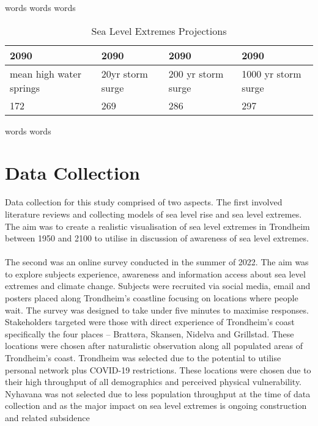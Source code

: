 words words words
\begin{table}[h]
    \centering
    \begin{tabular}{|l|l|l|l|}
    \hline
        2090 & 2090 & 2090 & 2090 \\ \hline
        mean high water springs & 20yr storm surge  & 200 yr storm surge  &  1000 yr storm surge  \\ \hline
        172 & 269 & 286 & 297 \\ \hline
    \end{tabular}
    \caption{Sea Level Extremes Projections}
    \label{2090_sle_projections}
\end{table}
words words
\section{Data Collection}

Data collection for this study comprised of two aspects.  The first involved literature reviews and collecting models of sea level rise and sea level extremes. The aim was to create a realistic visualisation of sea level extremes in Trondheim between 1950 and 2100 to utilise in discussion of awareness of sea level extremes. 
    \paragraph{}
The second was an online survey conducted in the summer of 2022. The aim was to explore subjects experience, awareness and information access about sea level extremes and climate change. Subjects were recruited via social media, email and posters placed along Trondheim’s coastline focusing on locations where people wait. The survey was designed to take under five minutes to maximise responses. Stakeholders targeted were those with direct experience of Trondheim’s coast specifically the four places – Brattøra, Skansen, Nidelva and Grillstad. These locations were chosen after naturalistic observation along all populated areas of Trondheim’s coast. Trondheim was selected due to the potential to utilise personal network plus COVID-19 restrictions. These locations were chosen due to their high throughput of all demographics and perceived physical vulnerability. Nyhavana was not selected due to less population throughput at the time of data collection and as the major impact on sea level extremes is ongoing construction and related subsidence \cite{miljoenheten_og_byplankontoret_trondheim_kommune_9-notat-om-havnivastigning-og-stormflo---hensyn-i-arealplanlegging-nyhavnapdf_2020}


